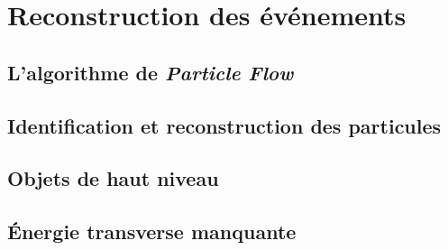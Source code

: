 \section{Reconstruction des événements}\label{chapter-LHC-section-evt_reco}

\subsection{L'algorithme de \emph{Particle Flow}}\label{chapter-LHC-section-evt_reco-subsec-PF}

\subsection{Identification et reconstruction des particules}\label{chapter-LHC-section-evt_reco-subsec-ptc_ID}

\subsection{Objets de haut niveau}\label{chapter-LHC-section-evt_reco-subsec-objets_haut_niveau}

\subsection{Énergie transverse manquante}\label{chapter-LHC-section-evt_reco-subsec-MET}
